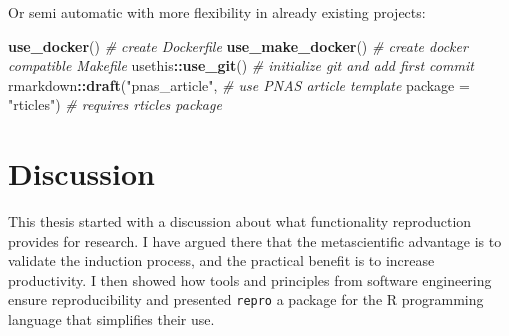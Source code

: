 \documentclass[12pt,a4paper,twoside]{article}
\newenvironment{Shaded}{\begin{snugshade}}{\end{snugshade}}
\newcommand{\CommentTok}[1]{\textcolor[rgb]{0.56,0.35,0.01}{\textit{#1}}}
\newcommand{\DataTypeTok}[1]{\textcolor[rgb]{0.13,0.29,0.53}{#1}}
\newcommand{\KeywordTok}[1]{\textcolor[rgb]{0.13,0.29,0.53}{\textbf{#1}}}
\newcommand{\NormalTok}[1]{#1}
\newcommand{\OperatorTok}[1]{\textcolor[rgb]{0.81,0.36,0.00}{\textbf{#1}}}
\newcommand{\StringTok}[1]{\textcolor[rgb]{0.31,0.60,0.02}{#1}}
\begin{document}
Or semi automatic with more flexibility in already existing projects:

\begin{Shaded}
\begin{Highlighting}[]
\KeywordTok{use_docker}\NormalTok{() }\CommentTok{# create Dockerfile}
\KeywordTok{use_make_docker}\NormalTok{() }\CommentTok{# create docker compatible Makefile}
\NormalTok{usethis}\OperatorTok{::}\KeywordTok{use_git}\NormalTok{() }\CommentTok{# initialize git and add first commit}
\NormalTok{rmarkdown}\OperatorTok{::}\KeywordTok{draft}\NormalTok{(}\StringTok{"pnas_article"}\NormalTok{, }\CommentTok{# use PNAS article template}
                 \DataTypeTok{package =} \StringTok{"rticles"}\NormalTok{) }\CommentTok{# requires rticles package}
\end{Highlighting}
\end{Shaded}

\hypertarget{discussion}{%
\section{Discussion}\label{discussion}}

This thesis started with a discussion about what functionality reproduction provides for research.
I have argued there that the metascientific advantage is to validate the induction process, and the practical benefit is to increase productivity.
I then showed how tools and principles from software engineering ensure reproducibility and presented \texttt{repro} a package for the R programming language that simplifies their use.
\end{document}
